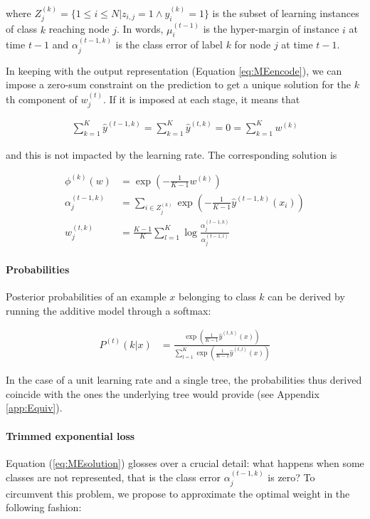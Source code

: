 \documentclass{article}
\begin{document}
where $Z_j^{(k)} = \{1 \leq i \leq N | z_{i,j} = 1 \wedge y_i^{(k)} = 1 \}$ is 
the subset of learning instances of class $k$ reaching node $j$. In words, 
$\mu_i^{(t-1)}$ is the hyper-margin of instance $i$ at time $t-1$ and 
$\alpha_j^{(t-1, k)}$ is the class error of label $k$ for node $j$ at time 
$t-1$.


In keeping with the output representation (Equation \ref{eq:MEencode}), we can 
impose a zero-sum constraint on the prediction to get a unique solution for the 
$k$th component of $w_j^{(t)}$. If it is imposed at each stage, it means that

\begin{align}\label{eq:MEzeroSum}
\sum_{k=1}^{K} \hat{y}^{(t-1, k)} = \sum_{k=1}^{K} 
\hat{y}^{(t, k)} = 0 = \sum_{k=1}^{K} w^{(k)}
\end{align}

and this is not impacted by the learning rate. The corresponding solution is

\begin{align}
\phi^{(k)}(w) &= \exp \left(-\frac{1}{K-1} w^{(k)}\right)\\ 
\label{eq:MEClsErrZS}
\alpha_j^{(t-1, k)} &= \sum_{i \in Z_j^{(k)}} \exp \left( -\frac{1}{K-1} 
\hat{y}^{(t-1, k)}(x_i) \right) \\ \label{eq:MEsolution}
w_j^{(t,k)} &= \frac{K-1}{K}  \sum_{l=1}^{K} \log \frac{\alpha_j^{(t-1, 
k)}}{\alpha_j^{(t-1, l)}} 
\end{align}

\paragraph{Probabilities}
Posterior probabilities of an example $x$ belonging to class $k$ can be derived 
by running the additive model through a softmax:

\begin{align}\label{eq:MEproba}
P^{(t)}(k|x) &= \frac{\exp \left(\frac{1}{K-1} \hat{y}^{(t, k)}(x) 
\right)}{\sum_{l=1}^K\exp \left(\frac{1}{K-1} \hat{y}^{(t, l)}(x) \right)}
\end{align}

In the case of a unit learning rate and a single tree, the probabilities thus 
derived coincide with the ones the underlying tree would provide (see Appendix 
\ref{app:Equiv}).


\paragraph{Trimmed exponential loss}
Equation (\ref{eq:MEsolution}) glosses over a crucial detail: what happens when 
some classes are not represented, that is the class error $\alpha_j^{(t-1, k)}$ 
is zero? To circumvent this problem, we propose to approximate the optimal 
weight in the following fashion:
\end{document}
